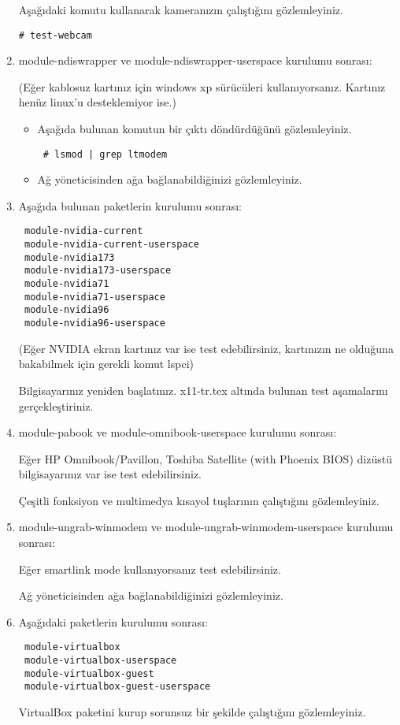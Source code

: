 \documentclass[a4paper,10pt]{article}
\begin{document}
\begin{enumerate}
Aşağıdaki komutu kullanarak kameranızın çalıştığını gözlemleyiniz.
\begin{verbatim}
# test-webcam
\end{verbatim}

\item module-ndiswrapper ve module-ndiswrapper-userspace kurulumu sonrası:

(Eğer kablosuz kartınız için windows xp sürücüleri kullanıyorsanız. Kartınız henüz linux'u desteklemiyor ise.)

\begin{itemize}
 \item Aşağıda bulunan komutun bir çıktı döndürdüğünü gözlemleyiniz.
 \begin{verbatim}
 # lsmod | grep ltmodem
 \end{verbatim}
\item Ağ yöneticisinden ağa bağlanabildiğinizi gözlemleyiniz.
\end{itemize}

\item Aşağıda bulunan paketlerin kurulumu sonrası:
 \begin{verbatim}
 module-nvidia-current
 module-nvidia-current-userspace
 module-nvidia173
 module-nvidia173-userspace
 module-nvidia71
 module-nvidia71-userspace
 module-nvidia96
 module-nvidia96-userspace
\end{verbatim}
(Eğer NVIDIA ekran kartınız var ise test edebilirsiniz, kartınızın ne olduğuna bakabilmek için gerekli komut lspci)

Bilgisayarınız yeniden başlatınız. x11-tr.tex altında bulunan test aşamalarını gerçekleştiriniz.

\item module-pabook ve module-omnibook-userspace  kurulumu sonrası: 

Eğer HP Omnibook/Pavillon, Toshiba Satellite (with Phoenix BIOS) dizüstü bilgisayarınız var ise test edebilirsiniz. 

Çeşitli fonksiyon ve multimedya kısayol tuşlarının çalıştığını gözlemleyiniz.

\item module-ungrab-winmodem ve module-ungrab-winmodem-userspace kurulumu sonrası: 

Eğer smartlink mode kullanıyorsanız test edebilirsiniz.

Ağ yöneticisinden ağa bağlanabildiğinizi gözlemleyiniz.

\item  Aşağıdaki paketlerin kurulumu sonrası: 
\begin{verbatim}
 module-virtualbox
 module-virtualbox-userspace
 module-virtualbox-guest
 module-virtualbox-guest-userspace
\end{verbatim}

VirtualBox paketini kurup sorunsuz bir şekilde çalıştığını gözlemleyiniz.

\end{enumerate}
\end{document}
